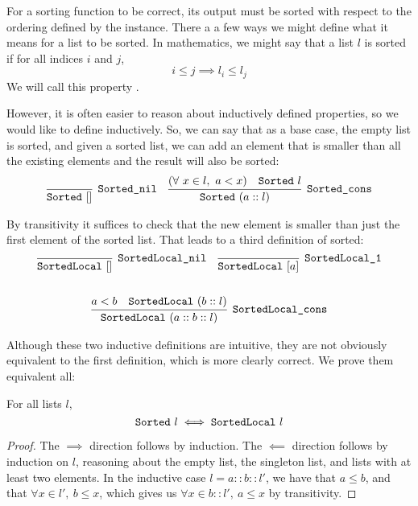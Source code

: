 \documentclass[11pt]{thesis}
\begin{document}
For a sorting function to be correct, its output must be sorted with
respect to the ordering defined by the  instance. There a
a few ways we might define what it means for a list to be sorted. In
mathematics, we might say that a list $l$ is sorted if for all indices
$i$ and $j$,
\begin{equation*}
  i \le j \implies l_i \le l_j
\end{equation*}
We will call this property .

However, it is often easier to reason about inductively defined
properties, so we would like to define  inductively. So,
we can say that as a base case, the empty list is sorted, and given a
sorted list, we can add an element that is smaller than all the
existing elements and the result will also be sorted:
\begin{align*}
  \infer[\var{Sorted\_nil}]{\var{Sorted}~[]}{}
  &&
  \infer[\var{Sorted\_cons}]{\var{Sorted}~(a :: l)}{%
    (\forall~x \in l,~a < x) & \var{Sorted}~l
  }
\end{align*}

By transitivity it suffices to check that the new element is
smaller than just the first element of the sorted list. That leads to a third definition of sorted:
\begin{gather*}
  \begin{align*}
    \infer[\var{SortedLocal\_nil}]{\var{SortedLocal}~[]}{}
    &&
    \infer[\var{SortedLocal\_1}]{\var{SortedLocal}~[a]}{}
  \end{align*}
  \\
  \\
  \infer[\var{SortedLocal\_cons}]{\var{SortedLocal}~(a :: b :: l)}{%
    a < b & \var{SortedLocal}~(b :: l)
  }
\end{gather*}

Although these two inductive definitions are intuitive, they are not
obviously equivalent to the first definition, which is more clearly
correct. We prove them equivalent all:
\begin{theorem}
  For all lists $l$,
  \begin{equation*}
    \texttt{Sorted}~l \iff \texttt{SortedLocal}~l
  \end{equation*}
\end{theorem}
\begin{proof}
  The $\implies$ direction follows by induction. The $\impliedby$
  direction follows by induction on $l$, reasoning about the empty
  list, the singleton list, and lists with at least two elements. In
  the inductive case $l = a :: b :: l'$, we have that $a \le b$, and
  that $\forall x \in l',~b \le x$, which gives us $\forall x \in b :: l',~a \le x$ by
  transitivity.
\end{proof}
\end{document}
